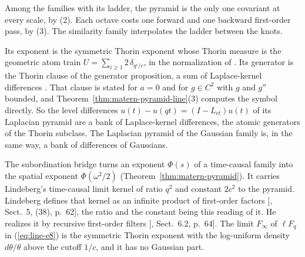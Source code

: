 Among the families with its ladder, the \Matern{} pyramid is the only one covariant at every
scale, by (2). Each octave costs one forward and one backward first-order pass, by (3). The
similarity family interpolates the ladder between the knots.

Its exponent is the symmetric Thorin exponent whose Thorin measure is the geometric atom train
$U = \sum_{i \ge 1}2\,\delta_{q^i/c}$, in the normalization of
. Its generator is the Thorin clause of the generator
proposition, a sum of Laplace-kernel differences . That
clause is stated for $a = 0$ and for $g \in C^2$ with $g$ and $g''$ bounded, and
Theorem~\ref{thm:matern-pyramid-line}(3) computes the symbol directly. So the level differences
$u(t) - u(qt) = (I - L_{ct})u(t)$ of its Laplacian pyramid are a bank of Laplace-kernel
differences, the atomic generators of the Thorin subclass. The Laplacian pyramid of the Gaussian
family is, in the same way, a bank of differences of Gaussians.

The subordination bridge turns an exponent $\Phi(s)$ of a time-causal family into the spatial
exponent $\Phi(\omega^2/2)$ (Theorem~\ref{thm:matern-pyramid}). It carries Lindeberg's time-causal
limit kernel of ratio $q^2$ and constant $2c^2$ to the \Matern{} pyramid. Lindeberg defines that
kernel as an infinite product of first-order factors
[, Sect.~5, (38), p.~62], the ratio and the constant being this reading of
it. He realizes it by recursive first-order filters [, Sect.~6.2, p.~64].
The limit $F_\infty$ of $\ell F_q$ in (\ref{eq:line-e8}) is the symmetric Thorin exponent with the log-uniform
density $d\theta/\theta$ above the cutoff $1/c$, and it has no Gaussian part.

